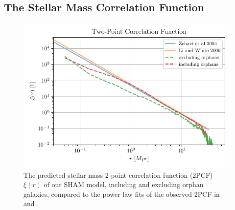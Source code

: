 \documentclass[a4paper,twocolumn,fleqn,usenatbib]{mnras}
\begin{document}
\subsection{The Stellar Mass Correlation Function}\label{chap:correlation}

\begin{figure}
  \centering
  \includegraphics[width=\linewidth, keepaspectratio]{images/correlation.pdf}%
  \caption{The  predicted stellar  mass  2-point correlation  function
    (2PCF) $\xi(r)$ of our SHAM  model, including and excluding orphan
    galaxies, compared to  the power law fits of the  observed 2PCF in
    \citet{LiWhite} and \citet{Correlation1}.
  }%
  \label{fig:correlations}
\end{figure}
\end{document}

